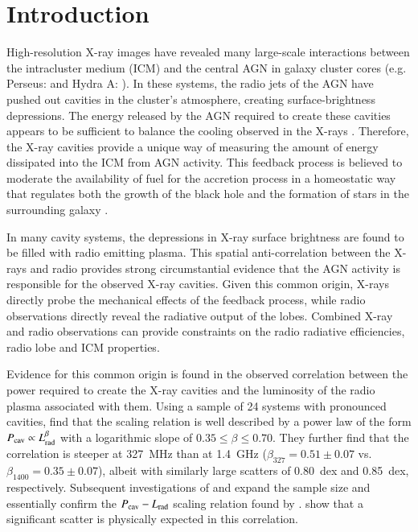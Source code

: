 \documentclass{aa}  %
\begin{document}

\section{Introduction}

High-resolution X-ray images have revealed many large-scale interactions between the intracluster medium (ICM) and the central AGN in galaxy cluster cores (e.g. Perseus: \citealp{Boehringer1993, Fabian2006, Fabian2011, Zhuravleva2015} and Hydra A: \citealp{McNamara2000, Nulsen2002, Wise2007}).  
In these systems, the radio jets of the AGN have pushed out cavities in the cluster's atmosphere, creating surface-brightness depressions. 
The energy released by the AGN required to create these cavities appears to be sufficient to balance the cooling observed in the X-rays \citep{Birzan2004, Rafferty2006, McNamaraNulsen2007}.
Therefore, the X-ray cavities provide a unique way of measuring the amount of energy dissipated into the ICM from AGN activity.
This feedback process is believed to moderate the availability of fuel for the accretion process in a homeostatic way that regulates both the growth of the black hole and the formation of stars in the surrounding galaxy \citep{Galaxy_Formation_Silk, MBH_Msigma_Gebhardt, SMBH_Galaxy_Ferrarese}. 

In many cavity systems, the depressions in X-ray surface brightness are found to be filled with radio emitting plasma.
This spatial anti-correlation between the X-rays and radio provides strong circumstantial evidence that the AGN activity is responsible for the observed X-ray cavities.
Given this common origin, X-rays directly probe the mechanical effects of the feedback process, while radio observations directly reveal the radiative output of the lobes.
Combined X-ray and radio observations can provide constraints on the radio radiative efficiencies, radio lobe and ICM properties.

Evidence for this common origin is found in the observed correlation between the power required to create the X-ray cavities  and the luminosity of the radio plasma associated with them. Using a sample of 24 systems with pronounced cavities, \citet{Birzan2008} find that the scaling relation is well described by a power law of the form $P_{\rm cav} \propto L_{\rm{rad}}^{\beta}$  with a logarithmic slope of  $0.35 \leq \beta \leq 0.70$. They further find that the correlation is steeper at 327~MHz than at 1.4~GHz ($\beta_{327}=0.51 \pm 0.07$ vs. $\beta_{1400}=0.35\pm0.07$), albeit with similarly large scatters of 0.80~dex and 0.85~dex, respectively. 
Subsequent investigations of \cite{Cavagnolo2010} and \cite{O'Sullivan2011} expand the sample size and essentially confirm the $P_{\rm cav} - L_{\rm{rad}}$ scaling relation found by \cite{Birzan2008}.
\cite{HardcastleKrause2013, HardcastleKrause2014} show that a significant scatter is physically expected in this correlation.
\end{document}
